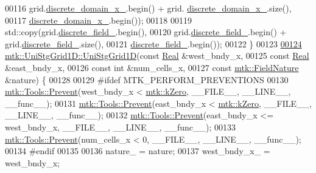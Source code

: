 \begin{DoxyCode}
00116               grid.\hyperlink{classmtk_1_1UniStgGrid1D_a0a1f9c00e21659e05f414dd97e2a52e3}{discrete\_domain\_x\_}.begin() + grid.
      \hyperlink{classmtk_1_1UniStgGrid1D_a0a1f9c00e21659e05f414dd97e2a52e3}{discrete\_domain\_x\_}.size(),
00117               \hyperlink{classmtk_1_1UniStgGrid1D_a0a1f9c00e21659e05f414dd97e2a52e3}{discrete\_domain\_x\_}.begin());
00118 
00119     std::copy(grid.\hyperlink{classmtk_1_1UniStgGrid1D_a7379a5c6d16210cdd61ffa731bc47edc}{discrete\_field\_}.begin(),
00120               grid.\hyperlink{classmtk_1_1UniStgGrid1D_a7379a5c6d16210cdd61ffa731bc47edc}{discrete\_field\_}.begin() + grid.\hyperlink{classmtk_1_1UniStgGrid1D_a7379a5c6d16210cdd61ffa731bc47edc}{discrete\_field\_}.size(),
00121               \hyperlink{classmtk_1_1UniStgGrid1D_a7379a5c6d16210cdd61ffa731bc47edc}{discrete\_field\_}.begin());
00122 \}
00123 
\hypertarget{mtk__uni__stg__grid__1d_8cc_source_l00124}{}\hyperlink{classmtk_1_1UniStgGrid1D_aa9b9db169c6e052e6fd6ffd6fca36646}{00124} \hyperlink{classmtk_1_1UniStgGrid1D_ab0c1bb8afad2420fdb4434eb21bdec82}{mtk::UniStgGrid1D::UniStgGrid1D}(\textcolor{keyword}{const} \hyperlink{group__c01-roots_gac080bbbf5cbb5502c9f00405f894857d}{Real} &west\_bndy\_x,
00125                                 \textcolor{keyword}{const} \hyperlink{group__c01-roots_gac080bbbf5cbb5502c9f00405f894857d}{Real} &east\_bndy\_x,
00126                                 \textcolor{keyword}{const} \textcolor{keywordtype}{int} &num\_cells\_x,
00127                                 \textcolor{keyword}{const} \hyperlink{group__c02-enums_ga4c54f2a329cfb4e56213b02a259d19e2}{mtk::FieldNature} &nature) \{
00128 
00129 \textcolor{preprocessor}{  #ifdef MTK\_PERFORM\_PREVENTIONS}
00130   \hyperlink{classmtk_1_1Tools_a332324c6f25e66be9dff48c5987a3b9f}{mtk::Tools::Prevent}(west\_bndy\_x < \hyperlink{group__c01-roots_ga59a451a5fae30d59649bcda274fea271}{mtk::kZero}, \_\_FILE\_\_, \_\_LINE\_\_, \_\_func\_\_);
00131   \hyperlink{classmtk_1_1Tools_a332324c6f25e66be9dff48c5987a3b9f}{mtk::Tools::Prevent}(east\_bndy\_x < \hyperlink{group__c01-roots_ga59a451a5fae30d59649bcda274fea271}{mtk::kZero}, \_\_FILE\_\_, \_\_LINE\_\_, \_\_func\_\_);
00132   \hyperlink{classmtk_1_1Tools_a332324c6f25e66be9dff48c5987a3b9f}{mtk::Tools::Prevent}(east\_bndy\_x <= west\_bndy\_x, \_\_FILE\_\_, \_\_LINE\_\_, \_\_func\_\_);
00133   \hyperlink{classmtk_1_1Tools_a332324c6f25e66be9dff48c5987a3b9f}{mtk::Tools::Prevent}(num\_cells\_x < 0, \_\_FILE\_\_, \_\_LINE\_\_, \_\_func\_\_);
00134 \textcolor{preprocessor}{  #endif}
00135 
00136   nature\_ = nature;
00137   west\_bndy\_x\_ = west\_bndy\_x;

\end{DoxyCode}
